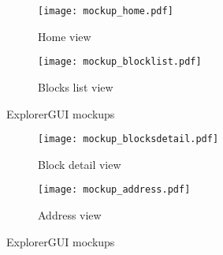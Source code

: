 \begin{figure}[h]
    \centering
    \begin{subfigure}[b]{.4\textwidth}
        \centering
        \texttt{[image: mockup\_home.pdf]}
        \caption{Home view}
        \label{homeMockup}
    \end{subfigure}
    \begin{subfigure}[b]{.4\textwidth}
        \centering
        \texttt{[image: mockup\_blocklist.pdf]}
        \caption{Blocks list view}
        \label{blocksMockup}
    \end{subfigure}
    \caption{ExplorerGUI mockups}
\end{figure}

\begin{figure}[h]
    \centering
    \begin{subfigure}[b]{.4\textwidth}
        \centering
        \texttt{[image: mockup\_blocksdetail.pdf]}
        \caption{Block detail view}
        \label{blockDetailMockup}
    \end{subfigure}
    \begin{subfigure}[b]{.4\textwidth}
        \centering
        \texttt{[image: mockup\_address.pdf]}
        \caption{Address view}
        \label{addressMockup}
    \end{subfigure}
    \caption{ExplorerGUI mockups}
\end{figure}

